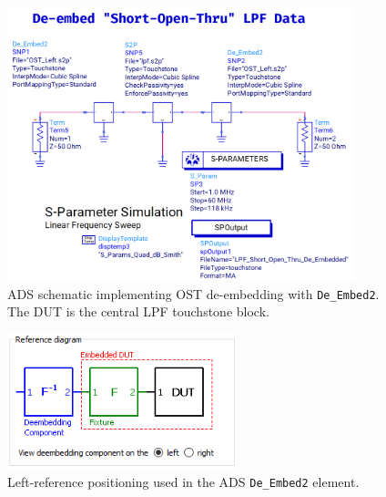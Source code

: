 \begin{figure}[H]
\centering
\includegraphics[width=0.9\textwidth]{Chapter_8/images/Lab_08_de-embedded-SOT_Schematic.png}
\caption{ADS schematic implementing OST de-embedding with \texttt{De\_Embed2}. The DUT is the central LPF touchstone block.}
\label{Ch8_fig:8}
\end{figure}

\begin{figure}[H]
\centering
\includegraphics[width=0.6\textwidth]{Chapter_8/images/Lab_08_left-de-embed-reference.png}
\caption{Left-reference positioning used in the ADS \texttt{De\_Embed2} element.}
\label{Ch8_fig:9}
\end{figure}

